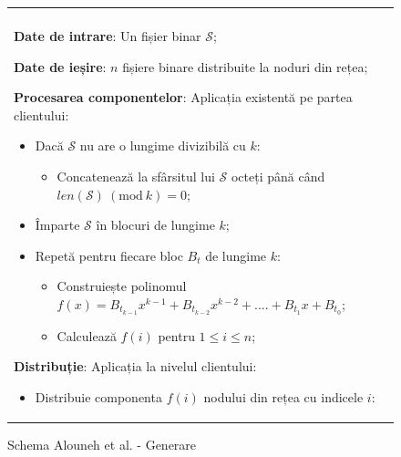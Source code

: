 \documentclass[oneside, 12pt]{book}
\newcommand{\Mod}[1]{\ (\text{mod}\ #1)}
\begin{document}
\begin{figure}[h!]

\begin{tabular}{|p{\textwidth}|}
\hline

\\
\hspace{.1in}
\textbf{Date de intrare}: Un fișier binar $\mathcal{S}$;
\medskip

\hspace{.1in}
\textbf{Date de ieșire}: $n$ fișiere binare distribuite la noduri din rețea;
\medskip

\hspace{.1in}
\textbf{Procesarea componentelor}: Aplicația existentă pe partea clientului: 
	\begin{itemize}
		\item Dacă $\mathcal{S}$ nu are o lungime divizibilă cu $k$:
			\begin{itemize}
			\item Concatenează la sfârsitul lui $\mathcal{S}$ octeți până când $len(\mathcal{S}) \Mod k = 0$;
			\end{itemize}
		\item Împarte $\mathcal{S}$ în blocuri de lungime $k$;
		\item Repetă pentru fiecare bloc $B_t$ de lungime $k$:
		\begin{itemize}
			\item Construiește polinomul $f(x) = B_{t_{k - 1}}x ^ {k-1} + B_{t_{k - 2}}x ^ {k - 2} + .... + B_{t_1}x + B_{t_0}$;
			\item Calculează $f(i)$ pentru $1 \leq i \leq n$;
		\end{itemize}
	\end{itemize}

\hspace{.1in}
\textbf{Distribuție}: Aplicația la nivelul clientului:
	\begin{itemize}
		\item Distribuie componenta $f(i)$ nodului din rețea cu indicele $i$:
	\end{itemize}

\\
\hline
\end{tabular}
\caption{Schema Alouneh et al. - Generare \cite{AAMK:2013}}
\label{fig:alouneh_distribution}
\end{figure}

\end{document}
